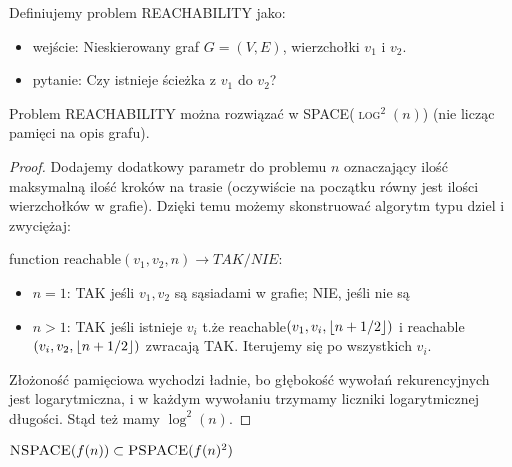 \begin{definition}
	Definiujemy problem \textsc{REACHABILITY} jako:
	\begin{itemize}
		\item wejście: Nieskierowany graf \( G = (V, E) \), wierzchołki \(v_1\) i \(v_2\).
		\item pytanie: Czy istnieje ścieżka z \(v_1\) do \(v_2\)?
	\end{itemize}
\end{definition}

\begin{lemma}
	Problem \textsc{REACHABILITY} można rozwiązać w \textsc{SPACE(\(\log^2(n)\))} (nie licząc pamięci na opis grafu).
\end{lemma}

\begin{proof}

	Dodajemy dodatkowy parametr do problemu \(n\) oznaczający ilość maksymalną ilość kroków na trasie (oczywiście na początku równy jest ilości wierzchołków w grafie). Dzięki temu możemy skonstruować algorytm typu dziel i zwyciężaj:

	function reachable\((v_1, v_2, n) \rightarrow TAK/NIE\):

	\begin{itemize}
		\item \( n = 1 \): TAK jeśli \(v_1, v_2\) są sąsiadami w grafie; NIE, jeśli nie są
		\item \( n > 1 \): TAK jeśli istnieje \(v_i\) t.że reachable\((v_1, v_i, \left\lfloor{n+1}/2\right\rfloor)\) i reachable\((v_i, v_2, \left\lfloor{n+1}/2\right\rfloor) \) zwracają TAK. Iterujemy się po wszystkich \(v_i\).
	\end{itemize}

	Złożoność pamięciowa wychodzi ładnie, bo głębokość wywołań rekurencyjnych jest logarytmiczna, i w każdym wywołaniu trzymamy liczniki logarytmicznej długości. Stąd też mamy \(\log^2(n)\).

\end{proof}

\begin{theorem}[Savitch]
	\( \textsc{NSPACE}(f(n)) \subset \textsc{PSPACE}(f(n)^2)\)
\end{theorem}

